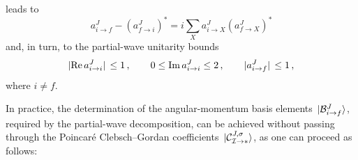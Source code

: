 leads to  
%
\begin{equation}
    a_{i\to f}^J - \left(a_{f\to i}^J\right)^* = i \sum_X a_{i\to X}^{J} \left(a_{f\to X}^{J}\right)^*
\end{equation}
%
and, in turn, to the partial-wave unitarity bounds
%
\begin{gather}
    \abs*{\Re a_{i\to i}^J}  \le 1 \,,\qquad  0 \le \Im a_{i\to i}^J \le 2\,,\qquad
    \abs*{a^J_{i\to f} }\le 1 \,,
\end{gather}
%
where $i\neq f$.
%

In practice, the determination of the angular-momentum basis elements $\ket*{\mathcal B^{J}_{i\to f}}$, required by the partial-wave decomposition,
can be achieved without passing through the Poincaré Clebsch--Gordan coefficients $\ket*{\mathcal C_{\mathcal I \to *}^{J,\sigma}}$, as one can proceed as follows:
%
